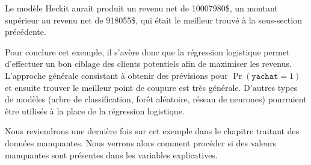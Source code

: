\documentclass[
  11pt,
  letterpaper,
]{book}
\newenvironment{Shaded}{\begin{snugshade}}{\end{snugshade}}
\newcommand{\AttributeTok}[1]{\textcolor[rgb]{0.40,0.45,0.13}{#1}}
\newcommand{\CommentTok}[1]{\textcolor[rgb]{0.37,0.37,0.37}{#1}}
\newcommand{\DecValTok}[1]{\textcolor[rgb]{0.68,0.00,0.00}{#1}}
\newcommand{\FunctionTok}[1]{\textcolor[rgb]{0.28,0.35,0.67}{#1}}
\newcommand{\NormalTok}[1]{\textcolor[rgb]{0.00,0.23,0.31}{#1}}
\newcommand{\OtherTok}[1]{\textcolor[rgb]{0.00,0.23,0.31}{#1}}
\newcommand{\SpecialCharTok}[1]{\textcolor[rgb]{0.37,0.37,0.37}{#1}}
\newcommand{\StringTok}[1]{\textcolor[rgb]{0.13,0.47,0.30}{#1}}
\theoremstyle{definition}
\theoremstyle{remark}
\begin{document}
\begin{Shaded}
\end{Shaded}

\begin{table}

\end{table}

Le modèle Heckit aurait produit un revenu net de 10007980\$, un montant
supérieur au revenu net de 918055\$, qui était le meilleur trouvé à la
sous-section précédente.

Pour conclure cet exemple, il s'avère donc que la régression logistique
permet d'effectuer un bon ciblage des clients potentiels afin de
maximiser les revenus. L'approche générale consistant à obtenir des
prévisions pour \(\Pr(\texttt{yachat}=1)\) et ensuite trouver le
meilleur point de coupure est très générale. D'autres types de modèles
(arbre de classification, forêt aléatoire, réseau de neurones)
pourraient être utilisés à la place de la régression logistique.

Nous reviendrons une dernière fois sur cet exemple dans le chapitre
traitant des données manquantes. Nous verrons alors comment procéder si
des valeurs manquantes sont présentes dans les variables explicatives.
\end{document}
